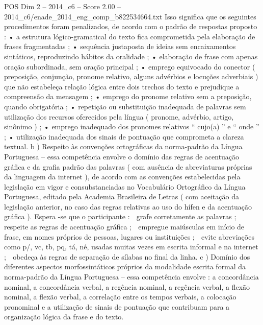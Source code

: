 \begin{textsample}{POS Dim 2 – 2014\_c6 – Score 2.00 – 2014\_c6/enade\_2014\_eng\_comp\_b822534664.txt}
Isso significa que os seguintes procedimentos foram penalizados, de acordo com o padrão de respostas proposto : • a estrutura lógico-gramatical do texto fica comprometida pela elaboração de frases fragmentadas ; • sequência justaposta de ideias sem encaixamentos sintáticos, reproduzindo hábitos da oralidade ; • elaboração de frase com apenas oração subordinada, sem oração principal ; • emprego equivocado do conector ( preposição, conjunção, pronome relativo, alguns advérbios e locuções adverbiais ) que não estabeleça relação lógica entre dois trechos do texto e prejudique a compreensão da mensagem ; • emprego do pronome relativo sem a preposição, quando obrigatória ; • repetição ou substituição inadequada de palavras sem utilização dos recursos oferecidos pela língua ( pronome, advérbio, artigo, sinônimo ) ; • emprego inadequado dos pronomes relativos “ cujo(a) ” e “ onde ” ; • utilização inadequada dos sinais de pontuação que comprometa a clareza textual. b ) Respeito às convenções ortográficas da norma-padrão da Língua Portuguesa – essa competência envolve o domínio das regras de acentuação gráfica e da grafia padrão das palavras ( com ausência de abreviaturas próprias da linguagem da internet ), de acordo com as convenções estabelecidas pela legislação em vigor e consubstanciadas no Vocabulário Ortográfico da Língua Portuguesa, editado pela Academia Brasileira de Letras ( com aceitação da legislação anterior, no caso das regras relativas ao uso do hífen e da acentuação gráfica ).
Espera -se que o participante :  grafe corretamente as palavras ;  respeite as regras de acentuação gráfica ;  empregue maiúsculas em início de frase, em nomes próprios de pessoas, lugares ou instituições ;  evite abreviações como p/, vc, tb, pq, tá, né, usadas muitas vezes em escrita informal e na internet ;  obedeça às regras de separação de sílabas no final da linha. c ) Domínio dos diferentes aspectos morfossintáticos próprios da modalidade escrita formal da norma-padrão da Língua Portuguesa – essa competência envolve : a concordância nominal, a concordância verbal, a regência nominal, a regência verbal, a flexão nominal, a flexão verbal, a correlação entre os tempos verbais, a colocação pronominal e a utilização de sinais de pontuação que contribuam para a organização lógica da frase e do texto.

\end{textsample}
